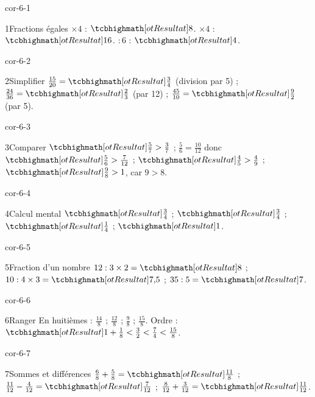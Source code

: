 \clearpage\pagestyle{otMain}\setlength{\otBlocEspacement}{2.5mm}\fontsize{11}{15}\selectfont{}
\begin{blocLivre}{cor-6-1}\begin{corrige}{1}{Fractions égales}
$\times4$ : $\res{8}$. $\times4$ : $\res{16}$. $:6$ : $\res4$.
\end{corrige}\end{blocLivre}
\begin{blocLivre}{cor-6-2}\begin{corrige}{2}{Simplifier}
$\frac{15}{20}=\res{\frac34}$ (division par 5) ; $\frac{24}{36}=\res{\frac23}$ (par 12) ; $\frac{45}{10}=\res{\frac92}$ (par 5).
\end{corrige}\end{blocLivre}
\begin{blocLivre}{cor-6-3}\begin{corrige}{3}{Comparer}
$\res{\frac57>\frac37}$ ; $\frac56=\frac{10}{12}$ donc $\res{\frac56>\frac7{12}}$ ; $\res{\frac45>\frac49}$ ; $\res{\frac98>1}$, car $9>8$.
\end{corrige}\end{blocLivre}
\begin{blocLivre}{cor-6-4}\begin{corrige}{4}{Calcul mental}
$\res{\frac34}$ ; $\res{\frac34}$ ; $\res{\frac14}$ ; $\res1$.
\end{corrige}\end{blocLivre}
\begin{blocLivre}{cor-6-5}\begin{corrige}{5}{Fraction d’un nombre}
$12:3\times2=\res8$ ; $10:4\times3=\res{7{,}5}$ ; $35:5=\res7$.
\end{corrige}\end{blocLivre}
\begin{blocLivre}{cor-6-6}\begin{corrige}{6}{Ranger}
En huitièmes : $\frac{14}8$ ; $\frac{12}8$ ; $\frac98$ ; $\frac{15}8$. Ordre : $\res{1+\frac18<\frac32<\frac74<\frac{15}8}$.
\end{corrige}\end{blocLivre}
\begin{blocLivre}{cor-6-7}\begin{corrige}{7}{Sommes et différences}
$\frac68+\frac58=\res{\frac{11}8}$ ; $\frac{11}{12}-\frac4{12}=\res{\frac7{12}}$ ; $\frac8{12}+\frac3{12}=\res{\frac{11}{12}}$.
\end{corrige}\end{blocLivre}
